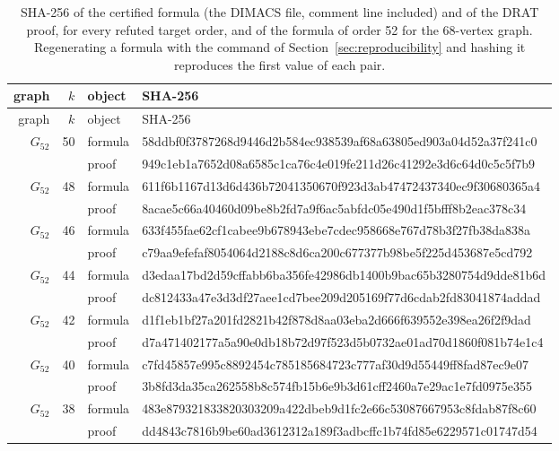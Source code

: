\documentclass[11pt]{article}
\theoremstyle{definition}
\theoremstyle{remark}
\newcommand{\Ga}{G_{52}}
\begin{document}
\begin{longtable}{@{}rrll@{}}
\caption{SHA-256 of the certified formula (the DIMACS file, comment line included) and of the DRAT proof, for every refuted target order, and of the formula of order 52 for the 68-vertex graph. Regenerating a formula with the command of Section~\ref{sec:reproducibility} and hashing it reproduces the first value of each pair.}\label{tab:hashes}\\
\toprule
graph & $k$ & object & SHA-256\\
\midrule
\endfirsthead
\toprule
graph & $k$ & object & SHA-256\\
\midrule
\endhead
\bottomrule
\endfoot
\bottomrule
\endlastfoot
$\Ga$ & 50 & formula & {\tiny\ttfamily 58ddbf0f3787268d9446d2b584ec938539af68a63805ed903a04d52a37f241c0} \\
 & & proof & {\tiny\ttfamily 949c1eb1a7652d08a6585c1ca76c4e019fe211d26c41292e3d6c64d0c5c5f7b9} \\
$\Ga$ & 48 & formula & {\tiny\ttfamily 611f6b1167d13d6d436b72041350670f923d3ab47472437340ec9f30680365a4} \\
 & & proof & {\tiny\ttfamily 8acae5c66a40460d09be8b2fd7a9f6ac5abfdc05e490d1f5bfff8b2eac378c34} \\
$\Ga$ & 46 & formula & {\tiny\ttfamily 633f455fae62cf1cabee9b678943ebe7cdec958668e767d78b3f27fb38da838a} \\
 & & proof & {\tiny\ttfamily c79aa9efefaf8054064d2188c8d6ca200c677377b98be5f225d453687e5cd792} \\
$\Ga$ & 44 & formula & {\tiny\ttfamily d3edaa17bd2d59cffabb6ba356fe42986db1400b9bac65b3280754d9dde81b6d} \\
 & & proof & {\tiny\ttfamily dc812433a47e3d3df27aee1cd7bee209d205169f77d6cdab2fd83041874addad} \\
$\Ga$ & 42 & formula & {\tiny\ttfamily d1f1eb1bf27a201fd2821b42f878d8aa03eba2d666f639552e398ea26f2f9dad} \\
 & & proof & {\tiny\ttfamily d7a471402177a5a90e0db18b72d97f523d5b0732ae01ad70d1860f081b74e1c4} \\
$\Ga$ & 40 & formula & {\tiny\ttfamily c7fd45857e995c8892454c785185684723c777af30d9d55449ff8fad87ec9e07} \\
 & & proof & {\tiny\ttfamily 3b8fd3da35ca262558b8c574fb15b6e9b3d61cff2460a7e29ac1e7fd0975e355} \\
$\Ga$ & 38 & formula & {\tiny\ttfamily 483e879321833820303209a422dbeb9d1fc2e66c53087667953c8fdab87f8c60} \\
 & & proof & {\tiny\ttfamily dd4843c7816b9be60ad3612312a189f3adbcffc1b74fd85e6229571c01747d54} \\

\end{longtable}
\end{document}
